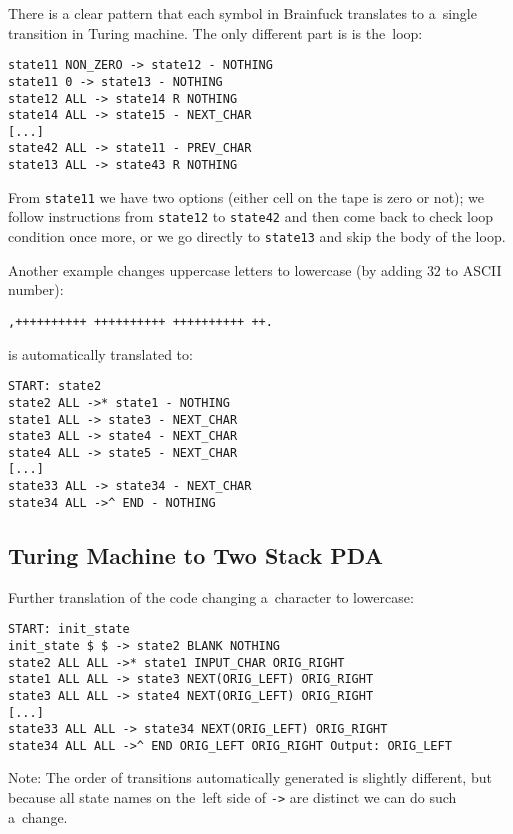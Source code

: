 \documentclass[english,shortabstract,mgr]{iithesis}
\begin{document}
There is a clear pattern that each symbol in Brainfuck translates
to a~single transition in Turing machine. The only different part is
is the~loop:
\begin{verbatim}
state11 NON_ZERO -> state12 - NOTHING
state11 0 -> state13 - NOTHING
state12 ALL -> state14 R NOTHING
state14 ALL -> state15 - NEXT_CHAR
[...]
state42 ALL -> state11 - PREV_CHAR
state13 ALL -> state43 R NOTHING
\end{verbatim}

From \texttt{state11} we have two options (either cell on the tape is zero
or not); we follow instructions from \texttt{state12} to \texttt{state42}
and then come back to check loop condition once more, or we go directly
to \texttt{state13} and skip the body of the loop.

Another example changes uppercase letters to lowercase (by adding $32$
to ASCII number):

\begin{verbatim}
,++++++++++ ++++++++++ ++++++++++ ++.
\end{verbatim}

is automatically translated to:

\begin{verbatim}
START: state2
state2 ALL ->* state1 - NOTHING
state1 ALL -> state3 - NEXT_CHAR
state3 ALL -> state4 - NEXT_CHAR
state4 ALL -> state5 - NEXT_CHAR
[...]
state33 ALL -> state34 - NEXT_CHAR
state34 ALL ->^ END - NOTHING
\end{verbatim}

\subsection{Turing Machine to Two Stack PDA}

Further translation of the code changing a~character to lowercase:

\begin{verbatim}
START: init_state
init_state $ $ -> state2 BLANK NOTHING
state2 ALL ALL ->* state1 INPUT_CHAR ORIG_RIGHT
state1 ALL ALL -> state3 NEXT(ORIG_LEFT) ORIG_RIGHT
state3 ALL ALL -> state4 NEXT(ORIG_LEFT) ORIG_RIGHT
[...]
state33 ALL ALL -> state34 NEXT(ORIG_LEFT) ORIG_RIGHT
state34 ALL ALL ->^ END ORIG_LEFT ORIG_RIGHT Output: ORIG_LEFT
\end{verbatim}

Note: The order of transitions automatically generated is slightly different,
but because all state names on the~left side of \texttt{->} are distinct
we can do such a~change.
\end{document}
